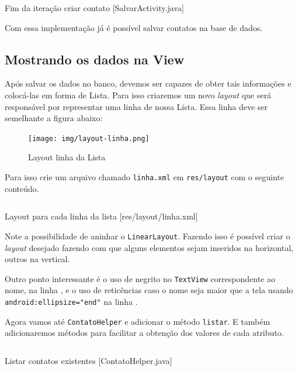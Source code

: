 \begin{listing}[H]
  \inputminted[linenos=true,frame=bottomline,tabsize=3]{ java }{ source/SalvarActivity-2.java }
  \caption{Fim da iteração criar contato [SalvarActivity.java]}
\end{listing}

Com essa implementação já é possível salvar contatos na base de dados.

\subsection{Mostrando os dados na View \label{ssec:listview}}

Após salvar os dados no banco, devemos ser capazes de obter tais
informações e colocá-las em forma de Lista. Para isso criaremos um novo
\emph{layout} que será responsável por representar uma linha de nossa
Lista. Essa linha deve ser semelhante a figura abaixo:

\begin{figure}[h]
    \centering
    \texttt{[image: img/layout-linha.png]}
    \caption{Layout linha da Lista}
\end{figure}

Para isso crie um arquivo chamado \texttt{linha.xml} em
\texttt{res/layout} com o seguinte conteúdo.

\begin{listing}[H]
  \inputminted[linenos=true,frame=bottomline,tabsize=3]{ xml }{ source/linha-1.xml }
  \caption{Layout para cada linha da lista [res/layout/linha.xml]}
\end{listing}

Note a possibilidade de aninhar o \texttt{LinearLayout}. Fazendo isso é
possível criar o \emph{layout} desejado fazendo com que alguns elementos
sejam inseridos na horizontal, outros na vertical.

Outro ponto interessante é o uso de negrito no \texttt{TextView}
correspondente ao nome, na linha , e o uso de reticências
caso o nome seja maior que a tela usando
\texttt{android:ellipsize="end"} na linha .

Agora vamos até \texttt{ContatoHelper} e adicionar o método
\texttt{listar}. E também adicionaremos métodos para facilitar a
obtenção dos valores de cada atributo.

\begin{listing}[H]
  \inputminted[linenos=true,frame=bottomline,tabsize=3]{ java }{ source/ContatoHelper-3.java }
  \caption{Listar contatos existentes [ContatoHelper.java]}
\end{listing}


